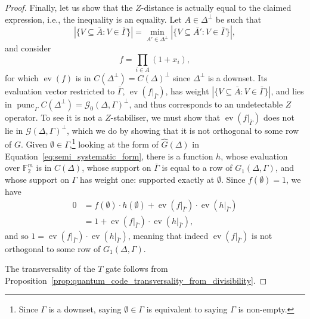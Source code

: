 \documentclass{article}
\DeclareMathOperator{\ev}{ev}
\DeclareMathOperator{\punc}{punc}
\begin{document}
\begin{proof}
    Finally, let us show that the $Z$-distance is actually equal to the claimed expression, i.e., the inequality is an equality. Let $A \in \Delta^\perp$ be such that
    \begin{equation}
        |\{V \subseteq \bar{A}: V \in \bar{\Gamma}\}| = \min_{A' \in \Delta^\perp} |\{V \subseteq \bar{A'}:V \in \bar{\Gamma}\}|,
    \end{equation}
    and consider
    \begin{equation}
        f = \prod_{i \in A}(1+x_i),
    \end{equation}
    for which $\ev(f)$ is in $C(\Delta^\perp) = C(\Delta)^\perp$ since $\Delta^\perp$ is a downset. Its evaluation vector restricted to $\bar{\Gamma}$, $\ev(f|_{\bar{\Gamma}})$, has weight $|\{V \subseteq \bar{A}: V \in \bar{\Gamma}\}|$, and lies in $\punc_{\Gamma}C(\Delta^\perp) = \mathcal{G}_0(\Delta, \Gamma)^\perp$, and thus corresponds to an undetectable $Z$ operator. To see it is not a $Z$-stabiliser, we must show that $\ev(f|_{\bar{\Gamma}})$ does not lie in $\mathcal{G}(\Delta, \Gamma)^\perp$, which we do by showing that it is not orthogonal to some row of $G$. Given $\emptyset \in \Gamma$,\footnote{Since $\Gamma$ is a downset, saying $\emptyset \in \Gamma$ is equivalent to saying $\Gamma$ is non-empty.} looking at the form of $\hat{G}(\Delta)$ in Equation~\eqref{eq:semi_systematic_form}, there is a function $h$, whose evaluation over $\mathbb{F}_2^m$ is in $C(\Delta)$, whose support on $\bar{\Gamma}$ is equal to a row of $G_1(\Delta, \Gamma)$, and whose support on $\Gamma$ has weight one: supported exactly at $\emptyset$. Since $f(\emptyset) = 1$, we have
    \begin{align}
        0 &= f(\emptyset)\cdot h(\emptyset) + \ev(f|_{\bar{\Gamma}})\cdot\ev(h|_{\bar{\Gamma}})\\
        &= 1 + \ev(f|_{\bar{\Gamma}})\cdot\ev(h|_{\bar{\Gamma}}),
    \end{align}
    and so $1 = \ev(f|_{\bar{\Gamma}})\cdot\ev(h|_{\bar{\Gamma}})$, meaning that indeed $\ev(f|_{\bar{\Gamma}})$ is not orthogonal to some row of $G_1(\Delta, \Gamma)$.

    The transversality of the $T$ gate follows from Proposition~\ref{prop:quantum_code_transversality_from_divisibility}.
\end{proof}
\end{document}
